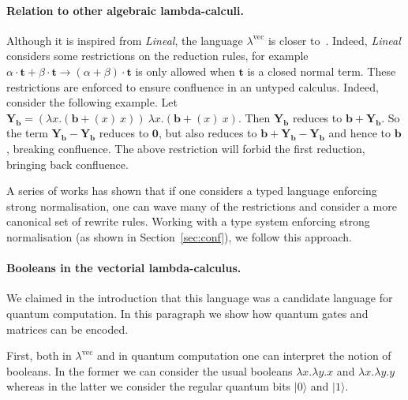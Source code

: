 \documentclass[colorlinks=true,linkcolor=black,urlcolor=black,citecolor=blue,submission,copyright,creativecommons]{eptcs}
\newcommand{\lvec}{\ensuremath{\lambda^{\!\!\textrm{vec}}}}
\newcommand{\ve}[1]{\mathrm{\textbf{#1}}}
\newcommand{\ket}[1]{{|{#1}\rangle}}
\begin{document}
\paragraph{Relation to other algebraic lambda-calculi.}
Although it is inspired from {\it Lineal}, the language $\lvec$ is closer
 to~\cite{ArrighiDiazcaroQPL09,DiazcaroPerdrixTassonValironHOR10,DiazcaroPetitWoLLIC12}.
Indeed, {\it Lineal} considers some restrictions on the reduction rules, for
example $\alpha\cdot\ve{t}+\beta\cdot\ve{t}\to(\alpha+\beta)\cdot\ve{t}$ is only
allowed when $\ve t$ is a closed normal term.
These restrictions are enforced to ensure confluence in an untyped
calculus. Indeed, consider the following example. Let $\ve Y_\ve
b=(\lambda x.(\ve b+(x)~x))~\lambda x.(\ve b+(x)~x)$. Then $\ve Y_\ve
b$ reduces to $\ve b+\ve Y_\ve b$. So the term $\ve Y_\ve b-\ve Y_\ve
b$ reduces to $\ve 0$, but also reduces to $\ve b+\ve Y_\ve b-\ve
Y_\ve b$ and hence to $\ve b$, breaking confluence. The above
restriction will forbid the first reduction, bringing back confluence.

A series of works
\cite{ArrighiDiazcaroQPL09,DiazcaroPerdrixTassonValironHOR10,DiazcaroPetitWoLLIC12}
has shown that if one considers a typed language enforcing
strong normalisation, one can wave many of the restrictions and
consider a more canonical set of rewrite rules. 
Working with a type system enforcing strong normalisation (as shown in Section~\ref{sec:conf}), we follow this approach.



\paragraph{Booleans in the vectorial lambda-calculus.}
We claimed in the introduction that this language was a candidate language for quantum computation. In this paragraph we show how quantum gates and matrices can be encoded.

First, both in $\lvec$ and in quantum computation one can interpret
the notion of booleans. In the former we can consider the usual
booleans $\lambda x.\lambda y.x$ and $\lambda x.\lambda y.y$ whereas
in the latter we consider the regular quantum bits $\ket{0}$ and
$\ket{1}$.
\end{document}
